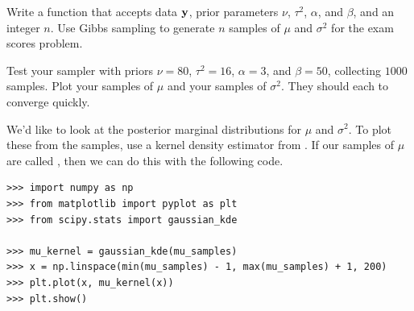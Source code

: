 \begin{problem}
Write a function that accepts data $\mathbf{y}$, prior parameters $\nu$, $\tau^2$, $\alpha$, and $\beta$, and an integer $n$.
Use Gibbs sampling to generate $n$ samples of $\mu$ and $\sigma^2$ for the exam scores problem.

Test your sampler with priors $\nu=80$, $\tau^{2} = 16$, $\alpha = 3$, and $\beta = 50$, collecting $1000$ samples.
Plot your samples of $\mu$ and your samples of $\sigma^{2}$.
They should each to converge quickly.
\end{problem}

We'd like to look at the posterior marginal distributions for $\mu$ and $\sigma^2$.
To plot these from the samples, use a kernel density estimator from .
If our samples of $\mu$ are called , then we can do this with the following code.
\begin{lstlisting}
>>> import numpy as np
>>> from matplotlib import pyplot as plt
>>> from scipy.stats import gaussian_kde

>>> mu_kernel = gaussian_kde(mu_samples)
>>> x = np.linspace(min(mu_samples) - 1, max(mu_samples) + 1, 200)
>>> plt.plot(x, mu_kernel(x))
>>> plt.show()
\end{lstlisting}


